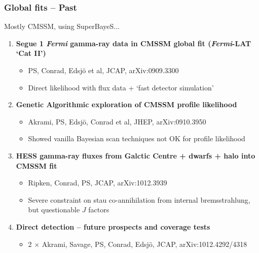 \documentclass[xcolor=dvipsnames]{beamer}
\begin{document}
\begin{frame}
\frametitle{Global fits -- Past}


Mostly CMSSM, using SuperBayeS...\vspace{5mm}

\begin{enumerate}
\item{\bf Segue 1 \emph{Fermi} gamma-ray data in CMSSM global fit (\emph{Fermi}-LAT `Cat II')}
\begin{itemize}
\item{PS, Conrad, Edsj\"o et al, JCAP, arXiv:0909.3300}
\item{Direct likelihood with flux data + `fast detector simulation'}
\end{itemize}

\item{\bf Genetic Algorithmic exploration of CMSSM profile likelihood}
\begin{itemize}
\item{Akrami, PS, Edsj\"o, Conrad et al, JHEP, arXiv:0910.3950}
\item{Showed vanilla Bayesian scan techniques not OK for profile likelihood}
\end{itemize}

\item{\bf HESS gamma-ray fluxes from Galctic Centre + dwarfs + halo into CMSSM fit}
\begin{itemize}
\item{Ripken, Conrad, PS, JCAP, arXiv:1012.3939}
\item{Severe constraint on stau co-annihilation from internal bremsstrahlung, but questionable $J$ factors}
\end{itemize}

\item{\bf Direct detection -- future prospects and coverage tests}
\begin{itemize}
\item{2 $\times$ Akrami, Savage, PS, Conrad, Edsj\"o, JCAP, arXiv:1012.4292/4318}
\end{itemize}

\end{enumerate}

\end{frame}
\end{document}
